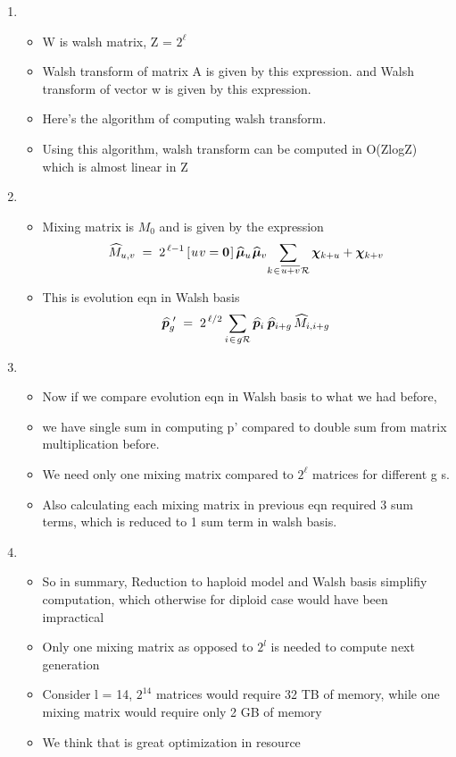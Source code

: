 \documentclass{article}
\newcommand{\nudge}{\hspace{0.01in}}
\begin{document}
\begin{enumerate}
\item
  \begin{itemize}
  \item W is walsh matrix, Z = $2^\ell$
  \item Walsh transform of matrix A is given by this expression. 
    and Walsh transform of vector w is given by this expression.
  \item Here's the algorithm of computing walsh transform.
  \item Using this algorithm, walsh transform can be computed in O(ZlogZ) which is almost linear in Z
  \end{itemize}
  
\item
  \begin{itemize}
  \item Mixing matrix is $M_0$ and is given by the expression
    \[
      \widehat{M}_{u,v} \; = \; 2^{\,\ell-1} \,[\nudge u \nudge v = {\bf
      0}\nudge]\, \widehat{\bm{\mu}}_u \nudge \widehat{\bm{\mu}}_v \!  \sum_{k
    \nudge \in \nudge \overline{u+v} \nudge \mathcal{R}} \bm{\chi}_{k + u} +
    \bm{\chi}_{k + v}
    \]
  \item This is evolution eqn in Walsh basis 
  \[
    \widehat{\bm{p}}_g^{\,\,\prime} \; = \; 2^{\,\ell/2} \sum_{i \nudge \in \nudge g \mathcal{R}}
    \widehat{\bm{p}}_i \, \nudge \widehat{\bm{p}}_{i+g} \,\widehat{M}_{i,i+g}
  \]  
  \end{itemize}
    
\item
  \begin{itemize}
  \item Now if we compare evolution eqn in Walsh basis to what we had before,
  \item we have single sum in computing p' compared to double sum from matrix multiplication before. 
  \item We need only one mixing matrix compared to $2^\ell$ matrices for different g s.
  \item Also calculating each mixing matrix in previous eqn required 3 sum terms, which is reduced to 1 sum term in walsh basis.   
  \end{itemize}
    
\item
  \begin{itemize}
  
  \item So in summary, Reduction to haploid model and Walsh basis simplifiy computation, which otherwise for diploid case would have been impractical
  \item Only one mixing matrix as opposed to $2^l$ is needed to compute next generation
  \item Consider l = 14, $2^{14}$ matrices would require 32 TB of
    memory, while one mixing matrix would require only 2 GB of memory
  \item We think that is great optimization in resource
  \end{itemize}
    

\end{enumerate}
\end{document}
